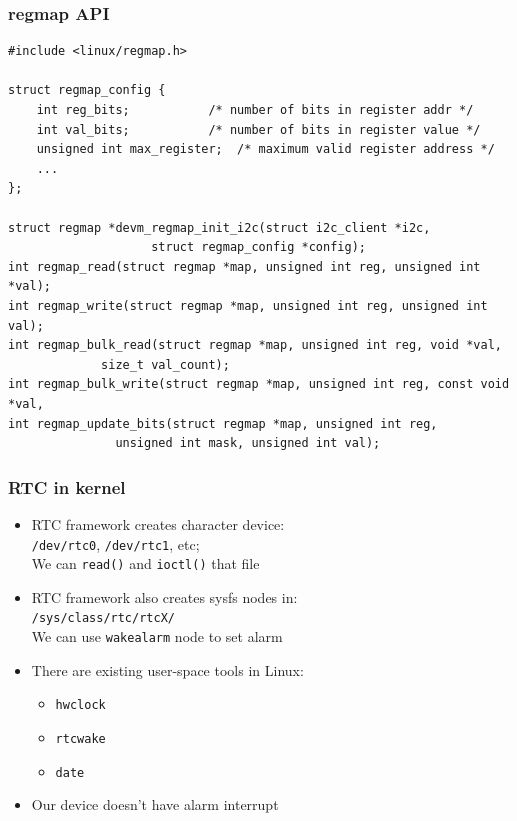 \documentclass[aspectratio=169,usenames,dvipsnames]{beamer}
\newcounter{cont}
\begin{document}
\begin{frame}[containsverbatim]
  \frametitle{regmap API}
  \begin{lstlisting}[style=c]
#include <linux/regmap.h>

struct regmap_config {
	int reg_bits;			/* number of bits in register addr */
	int val_bits;			/* number of bits in register value */
	unsigned int max_register;	/* maximum valid register address */
	...
};

struct regmap *devm_regmap_init_i2c(struct i2c_client *i2c,
				    struct regmap_config *config);
int regmap_read(struct regmap *map, unsigned int reg, unsigned int *val);
int regmap_write(struct regmap *map, unsigned int reg, unsigned int val);
int regmap_bulk_read(struct regmap *map, unsigned int reg, void *val,
		     size_t val_count);
int regmap_bulk_write(struct regmap *map, unsigned int reg, const void *val,
int regmap_update_bits(struct regmap *map, unsigned int reg,
		       unsigned int mask, unsigned int val);
  \end{lstlisting}
\end{frame}

\begin{frame}
  \frametitle{RTC in kernel}
  \begin{itemize}
    \item RTC framework creates character device: \\
          \texttt{/dev/rtc0}, \texttt{/dev/rtc1}, etc; \\
          We can \texttt{read()} and \texttt{ioctl()} that file
    \item RTC framework also creates sysfs nodes in: \\
          \texttt{/sys/class/rtc/rtcX/} \\
          We can use \texttt{wakealarm} node to set alarm
    \item There are existing user-space tools in Linux:
      \begin{itemize}
        \item \texttt{hwclock}
        \item \texttt{rtcwake}
        \item \texttt{date}
      \end{itemize}
    \item Our device doesn't have alarm interrupt
  \end{itemize}
\end{frame}
\end{document}
